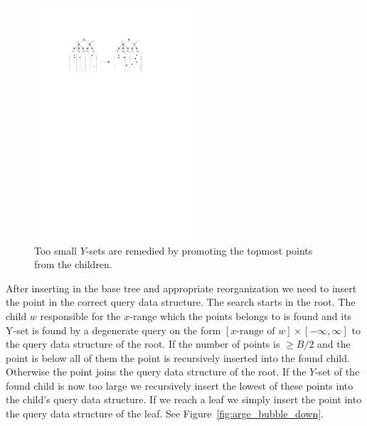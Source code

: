 \documentclass[twoside,11pt,openright]{report}
\begin{document}
\begin{figure}
\captionsetup{width=0.55\textwidth}
	\centering
		\includegraphics[width=0.55\textwidth]{../figures/arge_split_2}
	\caption{Too small $Y$-sets are remedied by promoting the topmost points from the children.}
	\label{fig:arge_split_2}
\end{figure}


After inserting in the base tree and appropriate reorganization we need to insert the point in the correct query data structure. The search starts in the root. The child $w$ responsible for the $x$-range which the points belongs to is found and its Y-set is found by a degenerate query on the form  $\left[ x\text{-range of }w \right] \times \left[ - \infty, \infty \right]$ to the query data structure of the root. If the number of points is $\geq B/2$ and the point is below all of them the point is recursively inserted into the found child. Otherwise the point joins the query data structure of the root. If the $Y$-set of the found child is now too large we recursively insert the lowest of these points into the child's query data structure. If we reach a leaf we simply insert the point into the query data structure of the leaf. See Figure~\ref{fig:arge_bubble_down}.
\end{document}
